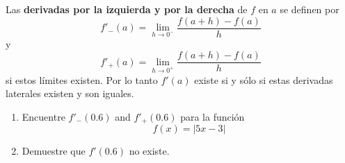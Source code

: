 \item Las \textbf{derivadas por la izquierda y por la derecha} de $f$ en $a$ se definen por
    $$f'_-(a) = \lim_{h \to 0^-} \frac{f(a + h) - f(a)}{h}$$
    y
    $$f'_+(a) = \lim_{h \to 0^+} \frac{f(a + h) - f(a)}{h}$$
    si estos límites existen. Por lo tanto $f'(a)$ existe si y sólo si estas derivadas laterales existen y son iguales.
    \begin{enumerate}
        \item Encuentre $f'_-(0.6)$ and $f'_+(0.6)$ para la función
        $$f(x) = |5x - 3|$$
        \item Demuestre que $f'(0.6)$ no existe.
    \end{enumerate}
